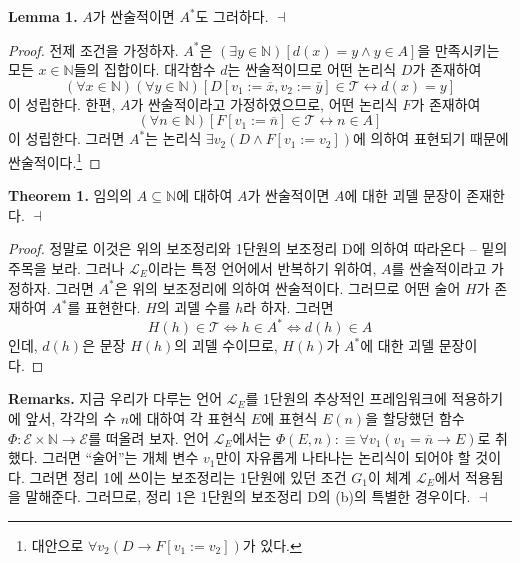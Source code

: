 \documentclass[12pt]{paper}
\newenvironment{context}[1][]
{ \noindent \textbf{{#1}.} }
{ \hfill $ \dashv $ }
\begin{document}
\begin{context}[Lemma 1]
$A$가 싼술적이면 $A^{*}$도 그러하다.
\end{context}

\begin{proof}
전제 조건을 가정하자.
$A^{*}$은 $\left( \exists y \in \mathbb{N} \right) \left[ d \left( x \right) = y \land y \in A \right]$을 만족시키는 모든 $x \in \mathbb{N}$들의 집합이다.
대각함수 $d$는 싼술적이므로 어떤 논리식 $D$가 존재하여 $$ \left( \forall x \in \mathbb{N} \right) \left( \forall y \in \mathbb{N} \right) \left[ D \left[ v_1 := \overline{x} , v_2 := \overline{y} \right] \in \mathcal{T} \leftrightarrow d \left( x \right) = y \right] $$이 성립한다.
한편, $A$가 싼술적이라고 가정하였으므로, 어떤 논리식 $F$가 존재하여 $$ \left( \forall n \in \mathbb{N} \right) \left[ F \left[ v_1 := \overline{n} \right] \in \mathcal{T} \leftrightarrow n \in A \right]$$이 성립한다.
그러면 $A^{*}$는 논리식 $\exists v_2 \left( D \land F \left[ v_1 := v_2 \right] \right)$에 의하여 표현되기 때문에 싼술적이다.\footnote
{
대안으로 $\forall v_2 \left( D \rightarrow F \left[ v_1 := v_2 \right] \right)$가 있다.
}
\end{proof}

\begin{context}[Theorem 1]
임의의 $A \subseteq \mathbb{N}$에 대하여 $A$가 싼술적이면 $A$에 대한 괴델 문장이 존재한다.
\end{context}

\begin{proof}
정말로 이것은 위의 보조정리와 1단원의 보조정리 D에 의하여 따라온다 -- 밑의 주목을 보라.
그러나 $\mathcal{L}_{E}$이라는 특정 언어에서 반복하기 위하여, $A$를 싼술적이라고 가정하자.
그러면 $A^{*}$은 위의 보조정리에 의하여 싼술적이다.
그러므로 어떤 술어 $H$가 존재하여 $A^{*}$를 표현한다.
$H$의 괴델 수를 $h$라 하자.
그러면 $$H \left( h \right) \in \mathcal{T} \iff h \in A^{*} \iff d \left( h \right) \in A$$인데,
$d \left( h \right)$은 문장 $H \left( h \right)$의 괴델 수이므로,
$H \left( h \right)$가 $A^{*}$에 대한 괴델 문장이다.
\end{proof}

\begin{context}[Remarks]
지금 우리가 다루는 언어 $\mathcal{L}_{E}$를 1단원의 추상적인 프레임워크에 적용하기에 앞서,
각각의 수 $n$에 대하여 각 표현식 $E$에 표현식 $E \left( n \right)$을 할당했던 함수 $\Phi : \mathcal{E} \times \mathbb{N} \to \mathcal{E}$를 떠올려 보자.
언어 $\mathcal{L}_{E}$에서는 $\Phi \left( E , n \right) : \equiv \forall v_1 \left( v_1 = \overline{n} \rightarrow E \right)$로 취했다.
그러면 ``술어''는 개체 변수 $v_1$만이 자유롭게 나타나는 논리식이 되어야 할 것이다.
그러면 정리 1에 쓰이는 보조정리는 1단원에 있던 조건 $G_1$이 체계 $\mathcal{L}_{E}$에서 적용됨을 말해준다.
그러므로, 정리 1은 1단원의 보조정리 D의 (b)의 특별한 경우이다.
\end{context}
\end{document}
